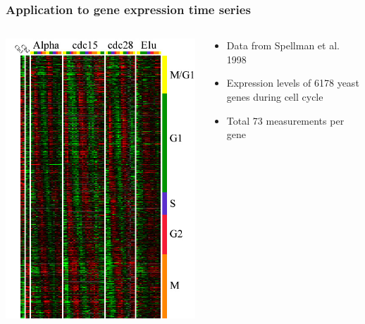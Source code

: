 \documentclass{beamer}
\begin{document}
\begin{frame}
\frametitle{Application to gene expression time series}
\begin{columns}
\begin{column}{0.4\textwidth}
\includegraphics[scale = 0.27]{yeast_cc_fig1.jpg}
\end{column}
\begin{column}{0.6\textwidth}

\begin{itemize}
\item Data from Spellman et al. 1998
\item Expression levels of 6178 yeast genes during cell cycle
\item Total 73 measurements per gene
\end{itemize}
\end{column}
\end{columns}
\end{frame}
\end{document}

